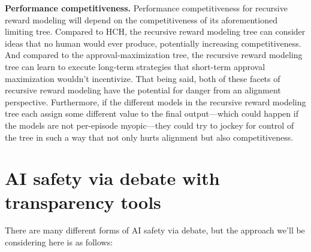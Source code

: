\documentclass[
  onecolumn,
  natbib,
]{miri-tech-article}
\begin{document}
\textbf{Performance competitiveness.} Performance competitiveness for recursive reward modeling will depend on the competitiveness of its aforementioned limiting tree. Compared to HCH, the recursive reward modeling tree can consider ideas that no human would ever produce, potentially increasing competitiveness. And compared to the approval-maximization tree, the recursive reward modeling tree can learn to execute long-term strategies that short-term approval maximization wouldn't incentivize. That being said, both of these facets of recursive reward modeling have the potential for danger from an alignment perspective. Furthermore, if the different models in the recursive reward modeling tree each assign some different value to the final output---which could happen if the models are not per-episode myopic---they could try to jockey for control of the tree in such a way that not only hurts alignment but also competitiveness.

\section{AI safety via debate with transparency tools}
\label{sec:9}

There are many different forms of AI safety via debate\cite{TODO: cite https://arxiv.org/abs/1805.00899}, but the approach we'll be considering here is as follows:
\end{document}
